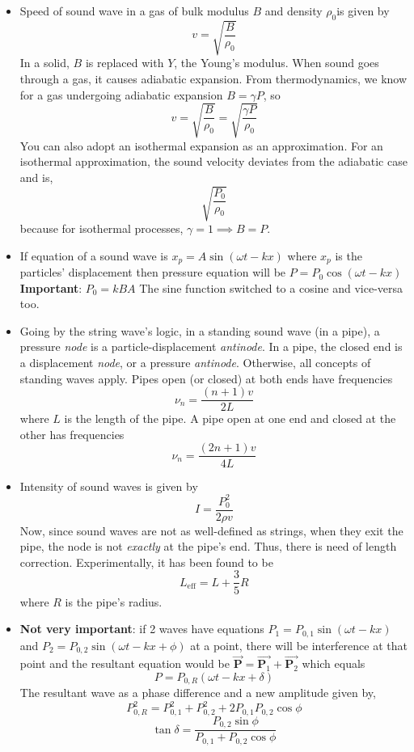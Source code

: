 \documentclass{scrartcl}
\begin{document}
    \begin{itemize}
        \item Speed of sound wave in a gas of bulk modulus $B$ and density $\rho_0$is given by \[v=\sqrt{\frac B{\rho_0}}\] In a solid, $B$ is replaced with $Y$, the Young's modulus. When sound goes through a gas, it causes adiabatic expansion. From thermodynamics, we know for a gas undergoing adiabatic expansion $B=\gamma P$, so \[\boxed{v=\sqrt{\frac B{\rho_0}}=\sqrt{\frac{\gamma P}{\rho_0}}}\] You can also adopt an isothermal expansion as an approximation. For an isothermal approximation, the sound velocity deviates from the adiabatic case and is, \[\sqrt{\frac{P_0}{\rho_0}}\] because for isothermal processes, $\gamma=1\implies B=P$.
        \item If equation of a sound wave is $x_p=A\sin\left(\omega t-kx\right)$ where $x_p$ is the particles' displacement then pressure equation will be $\boxed{P=P_0\cos\left(\omega t-kx\right)}$ \textbf{Important}: $\boxed{P_0=kBA}$ The sine function switched to a cosine and vice-versa too.
        \item Going by the string wave's logic, in a standing sound wave (in a pipe), a pressure \textit{node} is a particle-displacement \textit{antinode}. In a pipe, the closed end is a displacement \textit{node}, or a pressure \textit{antinode}. Otherwise, all concepts of standing waves apply. Pipes open (or closed) at both ends have frequencies \[\nu_n=\frac{(n+1)v}{2L}\] where $L$ is the length of the pipe. A pipe open at one end and closed at the other has frequencies \[\nu_n=\frac{(2n+1)v}{4L}\]
        \item Intensity of sound waves is given by \[I=\frac{P_0^2}{2\rho v}\] Now, since sound waves are not as well-defined as strings, when they exit the pipe, the node is not \textit{exactly} at the pipe's end. Thus, there is need of length correction. Experimentally, it has been found to be \[\boxed{L_\text{eff}=L+\frac35R}\] where $R$ is the pipe's radius.
        \item \textbf{Not very important}: if 2 waves have equations $P_1=P_{0,1}\sin\left(\omega t-kx\right)$ and $P_2=P_{0,2}\sin\left(\omega t-kx+\phi\right)$ at a point, there will be interference at that point and the resultant equation would be $\vec{\mathbf P}=\vec{\mathbf P_1}+\vec{\mathbf P_2}$ which equals \[P=P_{0,R}\left(\omega t-kx+\delta\right)\] The resultant wave as a phase difference and a new amplitude given by, \[P_{0,R}^2=P_{0,1}^2+P_{0,2}^2+2P_{0,1}P_{0,2}\cos\phi\]\[\tan\delta=\frac{P_{0,2}\sin\phi}{P_{0,1}+P_{0,2}\cos\phi}\]

\end{itemize}
\end{document}
